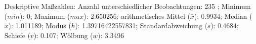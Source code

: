 				\label{tableValues:wgt_t1}
				\vspace*{-\baselineskip}
                    \begin{noten}
                	    \note{} Deskriptive Maßzahlen:
                	    Anzahl unterschiedlicher Beobachtungen: 235%
                	    ; 
                	      Minimum ($min$): 0; 
                	      Maximum ($max$): 2.650256; 
                	      arithmetisches Mittel ($\bar{x}$): \num[round-mode=places,round-precision=2]{0.9934}; 
                	      Median ($\tilde{x}$): 1.011189; 
                	      Modus ($h$): 1.39716422557831; 
                	      Standardabweichung ($s$): \num[round-mode=places,round-precision=2]{0.4684}; 
                	      Schiefe ($v$): \num[round-mode=places,round-precision=2]{0.107}; 
                	      Wölbung ($w$): \num[round-mode=places,round-precision=2]{3.3496}
                     \end{noten}



